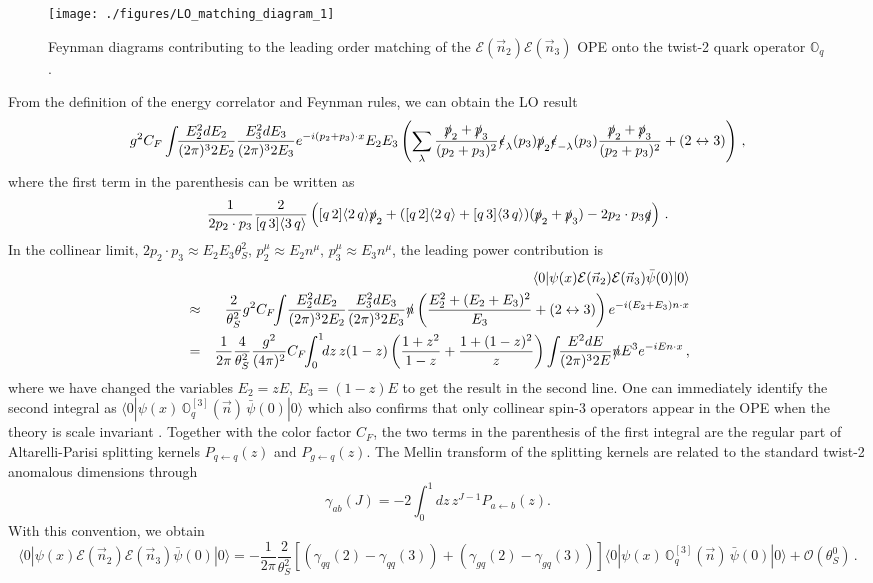 \documentclass[letterpaper,11pt]{article}
\def\beq{\begin{equation}}
\def\eeq{\end{equation}}
\def\bea{\begin{eqnarray}}
\def\eea{\end{eqnarray}}
\def\nn{{\nonumber}}
\def\beq{\begin{equation}}
\def\eeq{\end{equation}}
\begin{document}
\begin{figure}[htbp]
\begin{center}
\texttt{[image: ./figures/LO\_matching\_diagram\_1]}
\caption{Feynman diagrams contributing to the leading order matching of the $\mathcal{E}(\vec{n}_2)\mathcal{E}(\vec{n}_3)$ OPE onto the twist-2 quark operator $\mathbb{O}_{q}$.}
\label{fig: EE_OPE_1}
\end{center}
\end{figure}


From the definition of the energy correlator and Feynman rules, we can obtain the LO result
\beq
g^2 C_F\int\!\! \frac{E_2^2 dE_2}{(2\pi)^3 2E_2} \frac{E_3^2 dE_3}{(2\pi)^3 2E_3} e^{-i (p_2+p_3)\cdot x} E_2 E_3\left(\sum_{\lambda} \frac{\slashed{p}_2+\slashed{p}_3}{(p_2+p_3)^2} \slashed{\epsilon}_\lambda(p_3) \slashed{p}_2 \slashed{\epsilon}_{-\lambda}(p_3) \frac{\slashed{p}_2+\slashed{p}_3}{(p_2+p_3)^2} + (2\leftrightarrow 3)\right)\,, \nonumber
\eeq
where the first term in the parenthesis can be written as
\beq
\frac{1}{2p_2\cdot p_3}\frac{2}{ [q\, 3] \langle 3\, q\rangle}\left( [q\,2]\langle 2\, q\rangle \slashed{p}_2 +([q\, 2]\langle 2\, q\rangle+ [q\, 3]\langle 3\, q\rangle)(\slashed{p}_2+\slashed{p}_3) -2p_2\cdot p_3 \slashed{q}  \right)\,. \nonumber
\eeq
%
In the collinear limit, $2p_2\cdot p_3\approx E_2 E_3 \theta_S^2,\, p_2^\mu\approx E_2 n^\mu,\, p_3^\mu\approx E_3 n^\mu $, the leading power contribution is 
\bea\label{eq:change_var}
& &\langle 0 |  \psi(x) \mathcal{E}(\vec{n}_2)\mathcal{E}(\vec{n}_3) \bar{\psi}(0) | 0\rangle\nn \\
&\approx& \frac{2}{\theta_S^2} g^2 C_F\!\! \int\! \frac{E_2^2 dE_2}{(2\pi)^3 2E_2} \frac{E_3^2 dE_3}{(2\pi)^3 2E_3}  \slashed{n}  \left(\frac{E_2^2+(E_2+E_3)^2}{E_3} +(2\leftrightarrow 3) \right) e^{-i (E_2+E_3)n\cdot x}\nonumber\\
&=& \frac{1}{2\pi}\frac{4}{\theta_S^2} \frac{g^2}{(4\pi)^2} C_F\!\! \int_0^1 \!\! dz\, z(1-z)\left(\frac{1+z^2}{1-z}+\frac{1+(1-z)^2}{z} \right) \int \!\! \frac{E^2 dE}{(2\pi)^3 2E} \slashed{n} E^3 e^{-i E n\cdot x}\,, \nonumber
\eea
where we have changed the variables $E_2=z E, \, E_3=(1-z) E$ to get the result in the second line. One can immediately identify the second integral as $\langle 0| \psi(x) \, \mathbb{O}_q^{[3]}(\vec{n})\, \bar{\psi}(0) | 0 \rangle$ which also confirms that only collinear spin-3 operators appear in the OPE when the theory is scale invariant \cite{Hofman:2008ar}. Together with the color factor $C_F$, the two terms in the parenthesis of the first integral are  the regular part of Altarelli-Parisi splitting kernels $P_{q\leftarrow q}(z)$ and $P_{g\leftarrow q}(z)$. The Mellin transform of the splitting kernels are related to the standard twist-2 anomalous dimensions through
\beq
\gamma_{ab} (J)=-2\int_0^1 dz\, z^{J-1} P_{a \leftarrow b}(z).
\eeq
With this convention, we obtain
\beq \label{eq: EE_OPE_quark_state}
\langle 0 |  \psi(x) \mathcal{E}(\vec{n}_2)\mathcal{E}(\vec{n}_3) \bar{\psi}(0) | 0\rangle
=-\frac{1}{2\pi} \frac{2}{\theta_S^2} \left[(\gamma_{qq}(2)-\gamma_{qq}(3))+(\gamma_{gq}(2)-\gamma_{gq}(3)) \right] \langle 0| \psi(x) \, \mathbb{O}_q^{[3]}(\vec{n})\, \bar{\psi}(0) | 0 \rangle+\mathcal{O}(\theta_S^0)\,.
\eeq
\end{document}
